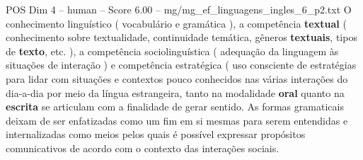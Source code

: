 \begin{textsample}{POS Dim 4 – human – Score 6.00 – mg/mg\_ef\_linguagens\_ingles\_6\_p2.txt}  \label{ex:f4_pos_002}
O conhecimento linguístico ( vocabulário e gramática ), a competência \textbf{textual} ( conhecimento sobre textualidade, continuidade temática, gêneros \textbf{textuais}, tipos de \textbf{texto}, etc. ), a competência sociolinguística ( adequação da linguagem às situações de interação ) e competência estratégica ( uso consciente de estratégias para lidar com situações e contextos pouco conhecidos nas várias interações do dia-a-dia por meio da língua estrangeira, tanto na modalidade \textbf{oral} quanto na \textbf{escrita} se articulam com a finalidade de gerar sentido.
As formas gramaticais deixam de ser enfatizadas como um fim em si mesmas para serem entendidas e internalizadas como meios pelos quais é possível expressar propósitos comunicativos de acordo com o contexto das interações sociais.

\end{textsample}
